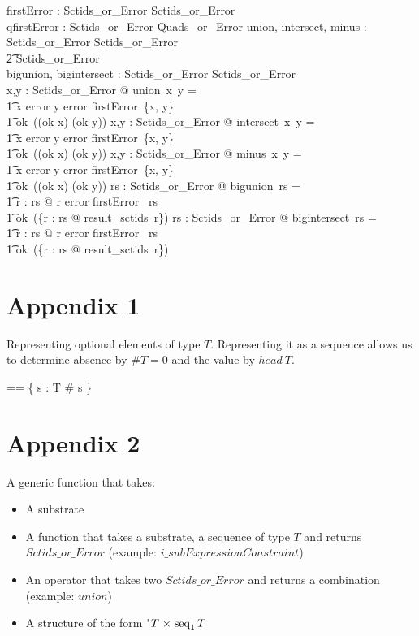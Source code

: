\documentclass{article}
\begin{document}
\begin{gendef}
   firstError : \power Sctids\_or\_Error \pfun Sctids\_or\_Error \\
   qfirstError : \power Sctids\_or\_Error \pfun Quads\_or\_Error 
\also
   union, intersect, minus : Sctids\_or\_Error \fun Sctids\_or\_Error \fun \\
\t2 Sctids\_or\_Error \\
   bigunion, bigintersect : \power Sctids\_or\_Error \fun Sctids\_or\_Error \\
\where
   \forall x,y : Sctids\_or\_Error @ union~x~y = \\
\t1 \IF x \in \ran error \lor  y \in \ran error \THEN firstError~\{x, y\} \\
\t1 \ELSE ok~((ok \inv x) \cup (ok \inv y))
\also
   \forall x,y : Sctids\_or\_Error @ intersect~x~y = \\
\t1 \IF x \in \ran error \lor y \in \ran error \THEN firstError~\{x, y\} \\
\t1 \ELSE ok~((ok \inv x) \cap (ok \inv y))
\also
   \forall x,y : Sctids\_or\_Error @ minus~x~y = \\
\t1 \IF x \in \ran error \lor y \in \ran error \THEN firstError~\{x, y\} \\
\t1 \ELSE ok~((ok \inv x) \setminus (ok \inv y))
\also
  \forall rs : \power Sctids\_or\_Error @ bigunion~rs = \\
\t1 \IF \exists r : rs @ r \in \ran error \THEN firstError~ rs \\
\t1 \ELSE ok~(\bigcup \{r : rs @ result\_sctids~r\})
\also
  \forall rs : \power Sctids\_or\_Error @ bigintersect~rs = \\
\t1 \IF \exists r : rs @ r \in \ran error \THEN firstError~ rs \\
\t1 \ELSE ok~(\bigcap \{r : rs @ result\_sctids~r\})
\end{gendef}

   

\section{Appendix 1}
Representing optional elements of type $T$.  Representing it as a sequence allows us to
determine absence by $\#T = 0$ and the value by $head~T$. 

\begin{zed} 
  \optional[T] == \{ s : \seq T \mid \# s  \} 
\end{zed}

\section{Appendix 2}
A generic function that takes:
\begin{itemize}[noitemsep]
\item A substrate
\item A function that takes a substrate, a sequence of type $T$ and returns $Sctids\_or\_Error$  (example: $i\_subExpressionConstraint$)
\item An operator that takes two $Sctids\_or\_Error$ and returns a combination (example: $union$)
\item A structure of the form "$T \mathrel{\times} \mathop{\mathrm{seq}}_1 T$
\end{itemize}
\end{document}
